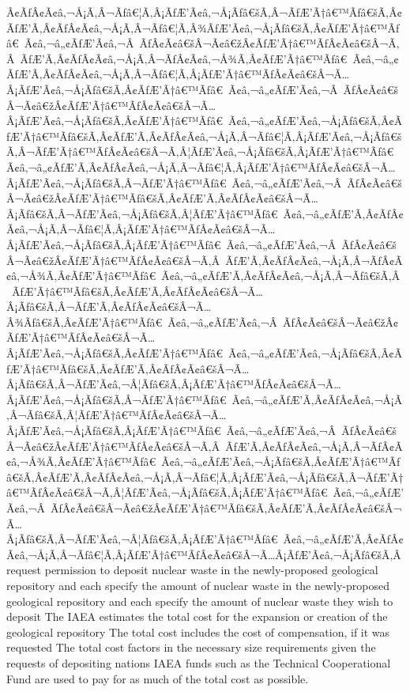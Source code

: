 \documentclass{article}
\begin{document}
\begin{outline}[enumerate]
Â¢ÃƒÂ¢Ã¢â‚¬Å¡Ã‚Â¬Ãƒâ€¦Ã‚Â¡ÃƒÆ’Ã¢â‚¬Å¡Ãƒâ€šÃ‚Â¬ÃƒÆ’Ã†â€™Ãƒâ€šÃ‚Â¢ÃƒÆ’Ã‚Â¢ÃƒÂ¢Ã¢â‚¬Å¡Ã‚Â¬Ãƒâ€¦Ã‚Â¾ÃƒÆ’Ã¢â‚¬Å¡Ãƒâ€šÃ‚Â¢ÃƒÆ’Ã†â€™Ãƒâ€ Ã¢â‚¬â„¢ÃƒÆ’Ã¢â‚¬Â ÃƒÂ¢Ã¢â€šÂ¬Ã¢â€žÂ¢ÃƒÆ’Ã†â€™ÃƒÂ¢Ã¢â€šÂ¬Ã‚Â ÃƒÆ’Ã‚Â¢ÃƒÂ¢Ã¢â‚¬Å¡Ã‚Â¬ÃƒÂ¢Ã¢â‚¬Å¾Ã‚Â¢ÃƒÆ’Ã†â€™Ãƒâ€ Ã¢â‚¬â„¢ÃƒÆ’Ã‚Â¢ÃƒÂ¢Ã¢â‚¬Å¡Ã‚Â¬Ãƒâ€¦Ã‚Â¡ÃƒÆ’Ã†â€™ÃƒÂ¢Ã¢â€šÂ¬Ã…Â¡ÃƒÆ’Ã¢â‚¬Å¡Ãƒâ€šÃ‚Â¢ÃƒÆ’Ã†â€™Ãƒâ€ Ã¢â‚¬â„¢ÃƒÆ’Ã¢â‚¬Â ÃƒÂ¢Ã¢â€šÂ¬Ã¢â€žÂ¢ÃƒÆ’Ã†â€™ÃƒÂ¢Ã¢â€šÂ¬Ã…Â¡ÃƒÆ’Ã¢â‚¬Å¡Ãƒâ€šÃ‚Â¢ÃƒÆ’Ã†â€™Ãƒâ€ Ã¢â‚¬â„¢ÃƒÆ’Ã¢â‚¬Å¡Ãƒâ€šÃ‚Â¢ÃƒÆ’Ã†â€™Ãƒâ€šÃ‚Â¢ÃƒÆ’Ã‚Â¢ÃƒÂ¢Ã¢â‚¬Å¡Ã‚Â¬Ãƒâ€¦Ã‚Â¡ÃƒÆ’Ã¢â‚¬Å¡Ãƒâ€šÃ‚Â¬ÃƒÆ’Ã†â€™ÃƒÂ¢Ã¢â€šÂ¬Ã‚Â¦ÃƒÆ’Ã¢â‚¬Å¡Ãƒâ€šÃ‚Â¡ÃƒÆ’Ã†â€™Ãƒâ€ Ã¢â‚¬â„¢ÃƒÆ’Ã‚Â¢ÃƒÂ¢Ã¢â‚¬Å¡Ã‚Â¬Ãƒâ€¦Ã‚Â¡ÃƒÆ’Ã†â€™ÃƒÂ¢Ã¢â€šÂ¬Ã…Â¡ÃƒÆ’Ã¢â‚¬Å¡Ãƒâ€šÃ‚Â¬ÃƒÆ’Ã†â€™Ãƒâ€ Ã¢â‚¬â„¢ÃƒÆ’Ã¢â‚¬Â ÃƒÂ¢Ã¢â€šÂ¬Ã¢â€žÂ¢ÃƒÆ’Ã†â€™Ãƒâ€šÃ‚Â¢ÃƒÆ’Ã‚Â¢ÃƒÂ¢Ã¢â€šÂ¬Ã…Â¡Ãƒâ€šÃ‚Â¬ÃƒÆ’Ã¢â‚¬Å¡Ãƒâ€šÃ‚Â¦ÃƒÆ’Ã†â€™Ãƒâ€ Ã¢â‚¬â„¢ÃƒÆ’Ã‚Â¢ÃƒÂ¢Ã¢â‚¬Å¡Ã‚Â¬Ãƒâ€¦Ã‚Â¡ÃƒÆ’Ã†â€™ÃƒÂ¢Ã¢â€šÂ¬Ã…Â¡ÃƒÆ’Ã¢â‚¬Å¡Ãƒâ€šÃ‚Â¡ÃƒÆ’Ã†â€™Ãƒâ€ Ã¢â‚¬â„¢ÃƒÆ’Ã¢â‚¬Â ÃƒÂ¢Ã¢â€šÂ¬Ã¢â€žÂ¢ÃƒÆ’Ã†â€™ÃƒÂ¢Ã¢â€šÂ¬Ã‚Â ÃƒÆ’Ã‚Â¢ÃƒÂ¢Ã¢â‚¬Å¡Ã‚Â¬ÃƒÂ¢Ã¢â‚¬Å¾Ã‚Â¢ÃƒÆ’Ã†â€™Ãƒâ€ Ã¢â‚¬â„¢ÃƒÆ’Ã‚Â¢ÃƒÂ¢Ã¢â‚¬Å¡Ã‚Â¬Ãƒâ€šÃ‚Â ÃƒÆ’Ã†â€™Ãƒâ€šÃ‚Â¢ÃƒÆ’Ã‚Â¢ÃƒÂ¢Ã¢â€šÂ¬Ã…Â¡Ãƒâ€šÃ‚Â¬ÃƒÆ’Ã‚Â¢ÃƒÂ¢Ã¢â€šÂ¬Ã…Â¾Ãƒâ€šÃ‚Â¢ÃƒÆ’Ã†â€™Ãƒâ€ Ã¢â‚¬â„¢ÃƒÆ’Ã¢â‚¬Â ÃƒÂ¢Ã¢â€šÂ¬Ã¢â€žÂ¢ÃƒÆ’Ã†â€™ÃƒÂ¢Ã¢â€šÂ¬Ã…Â¡ÃƒÆ’Ã¢â‚¬Å¡Ãƒâ€šÃ‚Â¢ÃƒÆ’Ã†â€™Ãƒâ€ Ã¢â‚¬â„¢ÃƒÆ’Ã¢â‚¬Å¡Ãƒâ€šÃ‚Â¢ÃƒÆ’Ã†â€™Ãƒâ€šÃ‚Â¢ÃƒÆ’Ã‚Â¢ÃƒÂ¢Ã¢â€šÂ¬Ã…Â¡Ãƒâ€šÃ‚Â¬ÃƒÆ’Ã¢â‚¬Â¦Ãƒâ€šÃ‚Â¡ÃƒÆ’Ã†â€™ÃƒÂ¢Ã¢â€šÂ¬Ã…Â¡ÃƒÆ’Ã¢â‚¬Å¡Ãƒâ€šÃ‚Â¬ÃƒÆ’Ã†â€™Ãƒâ€ Ã¢â‚¬â„¢ÃƒÆ’Ã‚Â¢ÃƒÂ¢Ã¢â‚¬Å¡Ã‚Â¬Ãƒâ€šÃ‚Â¦ÃƒÆ’Ã†â€™ÃƒÂ¢Ã¢â€šÂ¬Ã…Â¡ÃƒÆ’Ã¢â‚¬Å¡Ãƒâ€šÃ‚Â¡ÃƒÆ’Ã†â€™Ãƒâ€ Ã¢â‚¬â„¢ÃƒÆ’Ã¢â‚¬Â ÃƒÂ¢Ã¢â€šÂ¬Ã¢â€žÂ¢ÃƒÆ’Ã†â€™ÃƒÂ¢Ã¢â€šÂ¬Ã‚Â ÃƒÆ’Ã‚Â¢ÃƒÂ¢Ã¢â‚¬Å¡Ã‚Â¬ÃƒÂ¢Ã¢â‚¬Å¾Ã‚Â¢ÃƒÆ’Ã†â€™Ãƒâ€ Ã¢â‚¬â„¢ÃƒÆ’Ã¢â‚¬Å¡Ãƒâ€šÃ‚Â¢ÃƒÆ’Ã†â€™Ãƒâ€šÃ‚Â¢ÃƒÆ’Ã‚Â¢ÃƒÂ¢Ã¢â‚¬Å¡Ã‚Â¬Ãƒâ€¦Ã‚Â¡ÃƒÆ’Ã¢â‚¬Å¡Ãƒâ€šÃ‚Â¬ÃƒÆ’Ã†â€™ÃƒÂ¢Ã¢â€šÂ¬Ã‚Â¦ÃƒÆ’Ã¢â‚¬Å¡Ãƒâ€šÃ‚Â¡ÃƒÆ’Ã†â€™Ãƒâ€ Ã¢â‚¬â„¢ÃƒÆ’Ã¢â‚¬Â ÃƒÂ¢Ã¢â€šÂ¬Ã¢â€žÂ¢ÃƒÆ’Ã†â€™Ãƒâ€šÃ‚Â¢ÃƒÆ’Ã‚Â¢ÃƒÂ¢Ã¢â€šÂ¬Ã…Â¡Ãƒâ€šÃ‚Â¬ÃƒÆ’Ã¢â‚¬Â¦Ãƒâ€šÃ‚Â¡ÃƒÆ’Ã†â€™Ãƒâ€ Ã¢â‚¬â„¢ÃƒÆ’Ã‚Â¢ÃƒÂ¢Ã¢â‚¬Å¡Ã‚Â¬Ãƒâ€¦Ã‚Â¡ÃƒÆ’Ã†â€™ÃƒÂ¢Ã¢â€šÂ¬Ã…Â¡ÃƒÆ’Ã¢â‚¬Å¡Ãƒâ€šÃ‚Â request permission to deposit nuclear waste in the newly-proposed geological repository and each specify the amount of nuclear waste in the newly-proposed geological repository and each specify the amount of nuclear waste they wish to deposit
\2 The IAEA estimates the total cost for the expansion or creation of the geological repository
\3 The total cost includes the cost of compensation, if it was requested
\3 The total cost factors in the necessary size requirements given the requests of depositing nations
\3 IAEA funds such as the Technical Cooperational Fund are used to pay for as much of the total cost as possible.

\end{outline}
\end{document}
